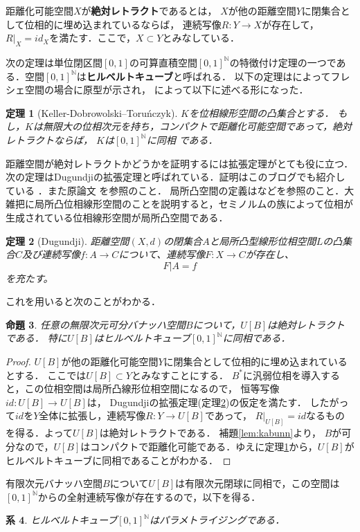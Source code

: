 \documentclass[leqno, a4paper, 12pt]{jsarticle}
\newtheorem{thm}{定理}
\newtheorem{prop}[thm]{命題}
\newtheorem{cor}[thm]{系}
\newcommand{\nn}{\mathbb{N}}
\begin{document}
距離化可能空間$X$が\textbf{絶対レトラクト}であるとは，
$X$が他の距離空間$Y$に閉集合として位相的に埋め込まれているならば，
連続写像$R: Y\to X$が存在して，$R|_{X}=id_X$を満たす．ここで，$X\subset Y$とみなしている．

次の定理は単位閉区間$[0, 1]$の可算直積空間$[0, 1]^{\nn}$の特徴付け定理の一つである．空間$[0, 1]^{\nn}$は\textbf{ヒルベルトキューブ}と呼ばれる．
以下の定理は\cite{Keller}によってフレシェ空間の場合に原型が示され，
\cite{0}によって以下に述べる形になった．
\begin{thm}[Keller-Dobrowolski--Toru\'nczyk]\label{KDT}
$K$を位相線形空間の凸集合とする．
もし，$K$は無限大の位相次元を持ち，コンパクトで距離化可能空間であって，絶対レトラクトならば，
$K$は$[0, 1]^{\nn}$に同相
である．
\end{thm}

距離空間が絶対レトラクトかどうかを証明するには拡張定理がとても役に立つ．
次の定理はDugundjiの拡張定理と呼ばれている．証明はこのブログでも紹介している \cite{con}．また原論文\cite{1} を参照のこと．
局所凸空間の定義は\cite{kaiseki}などを参照のこと．大雑把に局所凸位相線形空間のことを説明すると，セミノルムの族によって位相が生成されている位相線形空間が局所凸空間である．
\begin{thm}[Dugundji]\label{d}
距離空間$(X,d)$の閉集合$A$と局所凸型線形位相空間$L$の凸集合$C$及び連続写像$f:A\to C$について、連続写像$F:X\to C$が存在し、
\[
F|A=f
\]
を充たす。
\end{thm}

これを用いると次のことがわかる．
\begin{prop}
任意の無限次元可分バナッハ空間$B$について，$U[B]$は絶対レトラクトである．
特に$U[B]$はヒルベルトキューブ$[0, 1]^{\nn}$に同相である．
\end{prop}
\begin{proof}
 $U[B]$が他の距離化可能空間$Y$に閉集合として位相的に埋め込まれているとする．
 ここでは$U[B]\subset Y$とみなすことにする．
$B^*$に汎弱位相を導入すると，この位相空間は局所凸線形位相空間になるので，
 恒等写像$id: U[B]\to U[B]$は，
Dugundjiの拡張定理(定理\ref{d})の仮定を満たす．
したがって$id$を$Y$全体に拡張し，連続写像$R: Y\to U[B]$であって，
 $R|_{U[B]}=id$なるものを得る．よって$U[B]$は絶対レトラクトである．
 補題\ref{lem:kabunn}より，
 $B$が可分なので，$U[B]$はコンパクトで距離化可能である．ゆえに定理\ref{KDT}から，$U[B]$がヒルベルトキューブに同相であることがわかる．
\end{proof}

有限次元バナッハ空間$B$について$U[B]$は有限次元閉球に同相で，この空間は
$[0, 1]^{\nn}$からの全射連続写像が存在するので，以下を得る．
\begin{cor}
ヒルベルトキューブ$[0, 1]^{\nn}$はパラメトライジングである．
\end{cor}
\end{document}
